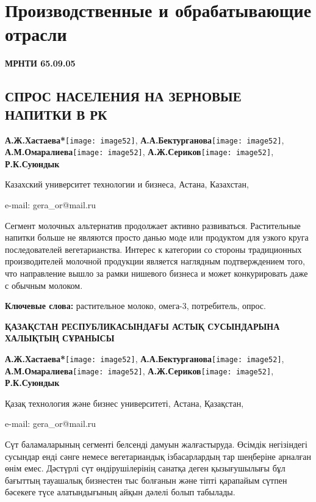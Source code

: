 \let\cleardoublepage\clearpage
\chapter{Производственные и обрабатывающие отрасли}

{\bfseries МРНТИ 65.09.05}

\section{СПРОС НАСЕЛЕНИЯ НА ЗЕРНОВЫЕ НАПИТКИ В РК}

\begin{center}
{\bfseries А.Ж.Хастаева*}\texttt{[image: image52]},
{\bfseries А.А.Бектурганова}\texttt{[image: image52]},
{\bfseries А.М.Омаралиева}\texttt{[image: image52]},
{\bfseries А.Ж.Сериков}\texttt{[image: image52]},
{\bfseries Р.К.Суюндык}

Казахский университет технологии и бизнеса, Астана, Казахстан,

e-mail: gera\_or@mail.ru
\end{center}

Сегмент молочных альтернатив продолжает активно развиваться.
Растительные напитки больше не являются просто данью моде или продуктом
для узкого круга последователей вегетарианства. Интерес к категории со
стороны традиционных производителей молочной продукции является
наглядным подтверждением того, что направление вышло за рамки нишевого
бизнеса и может конкурировать даже с обычным молоком.

{\bfseries Ключевые слова:} растительное молоко, омега-3, потребитель,
опрос.

\begin{center}
{\large\bfseries ҚАЗАҚСТАН РЕСПУБЛИКАСЫНДАҒЫ АСТЫҚ СУСЫНДАРЫНА ХАЛЫҚТЫҢ СҰРАНЫСЫ}

{\bfseries А.Ж.Хастаева*}\texttt{[image: image52]},
{\bfseries А.А.Бектурганова}\texttt{[image: image52]},
{\bfseries А.М.Омаралиева}\texttt{[image: image52]},
{\bfseries А.Ж.Сериков}\texttt{[image: image52]},
{\bfseries Р.К.Суюндык}

Қазақ технология және бизнес университеті, Астана, Қазақстан,

e-mail: gera\_or@mail.ru
\end{center}

Сүт баламаларының сегменті белсенді дамуын жалғастыруда. Өсімдік
негізіндегі сусындар енді сәнге немесе вегетариандық ізбасарлардың тар
шеңберіне арналған өнім емес. Дәстүрлі сүт өндірушілерінің санатқа деген
қызығушылығы бұл бағыттың тауашалық бизнестен тыс болғанын және тіпті
қарапайым сүтпен бәсекеге түсе алатындығының айқын дәлелі болып
табылады.

